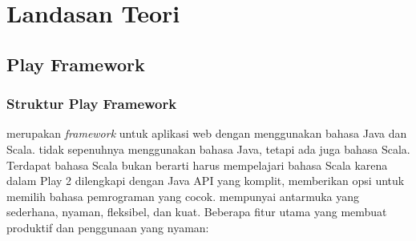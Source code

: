 \chapter{Landasan Teori}
\label{chap:LandasanTeori}

%
%
%
%

\section{Play Framework}
\label{sec:play}
\subsection{Struktur Play Framework}
\play \cite{playforjava} merupakan \textit{framework} untuk aplikasi web dengan menggunakan bahasa Java dan Scala. \play tidak sepenuhnya menggunakan bahasa Java, tetapi ada juga bahasa Scala. Terdapat bahasa Scala bukan berarti harus mempelajari bahasa Scala karena dalam Play 2 dilengkapi dengan Java API yang komplit, memberikan opsi untuk memilih bahasa pemrograman yang cocok. \play mempunyai antarmuka yang sederhana, nyaman, fleksibel, dan kuat. 
Beberapa fitur utama yang membuat \play produktif dan penggunaan yang nyaman:

